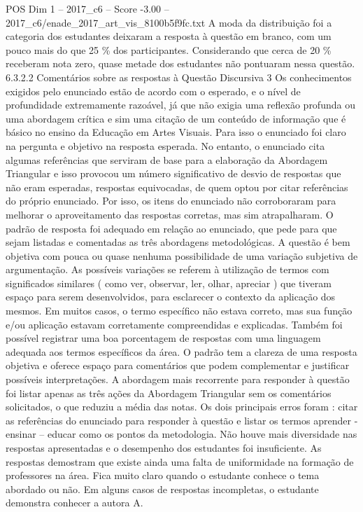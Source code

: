 \begin{textsample}{POS Dim 1 – 2017\_c6 – Score -3.00 – 2017\_c6/enade\_2017\_art\_vis\_8100b5f9fc.txt}
A moda da distribuição foi a categoria dos estudantes deixaram a resposta à questão em branco, com um pouco mais do que 25 \% dos participantes.
Considerando que cerca de 20 \% receberam nota zero, quase metade dos estudantes não pontuaram nessa questão. 6.3.2.2 Comentários sobre as respostas à Questão Discursiva 3 Os conhecimentos exigidos pelo enunciado estão de acordo com o esperado, e o nível de profundidade extremamente razoável, já que não exigia uma reflexão profunda ou uma abordagem crítica e sim uma citação de um conteúdo de informação que é básico no ensino da Educação em Artes Visuais.
Para isso o enunciado foi claro na pergunta e objetivo na resposta esperada.
No entanto, o enunciado cita algumas referências que serviram de base para a elaboração da Abordagem Triangular e isso provocou um número significativo de desvio de respostas que não eram esperadas, respostas equivocadas, de quem optou por citar referências do próprio enunciado.
Por isso, os itens do enunciado não corroboraram para melhorar o aproveitamento das respostas corretas, mas sim atrapalharam.
O padrão de resposta foi adequado em relação ao enunciado, que pede para que sejam listadas e comentadas as três abordagens metodológicas.
A questão é bem objetiva com pouca ou quase nenhuma possibilidade de uma variação subjetiva de argumentação.
As possíveis variações se referem à utilização de termos com significados similares ( como ver, observar, ler, olhar, apreciar ) que tiveram espaço para serem desenvolvidos, para esclarecer o contexto da aplicação dos mesmos.
Em muitos casos, o termo específico não estava correto, mas sua função e/ou aplicação estavam corretamente compreendidas e explicadas.
Também foi possível registrar uma boa porcentagem de respostas com uma linguagem adequada aos termos específicos da área.
O padrão tem a clareza de uma resposta objetiva e oferece espaço para comentários que podem complementar e justificar possíveis interpretações.
A abordagem mais recorrente para responder à questão foi listar apenas as três ações da Abordagem Triangular sem os comentários solicitados, o que reduziu a média das notas.
Os dois principais erros foram : citar as referências do enunciado para responder à questão e listar os termos aprender - ensinar – educar como os pontos da metodologia.
Não houve mais diversidade nas respostas apresentadas e o desempenho dos estudantes foi insuficiente.
As respostas demostram que existe ainda uma falta de uniformidade na formação de professores na área.
Fica muito claro quando o estudante conhece o tema abordado ou não.
Em alguns casos de respostas incompletas, o estudante demonstra conhecer a autora A.

\end{textsample}
